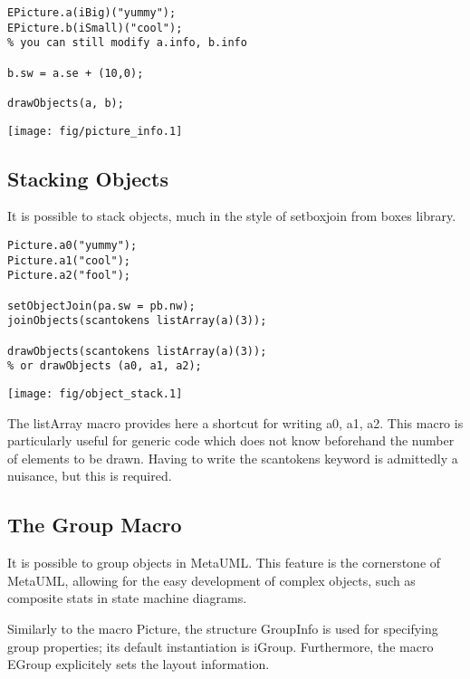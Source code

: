\documentclass{article}
\newcommand{\code}{\ttfamily}
\newcommand{\metauml}{MetaUML}
\begin{document}
\begin{multicols}{2}
\begin{verbatim}
EPicture.a(iBig)("yummy");
EPicture.b(iSmall)("cool");
% you can still modify a.info, b.info

b.sw = a.se + (10,0);

drawObjects(a, b);
\end{verbatim}
\columnbreak
\hspace{1cm}\texttt{[image: fig/picture\_info.1]}
\end{multicols}

\subsection{Stacking Objects}

It is possible to stack objects, much in the style of {\code setboxjoin}
from {\code boxes} library.

\pagebreak

\begin{multicols}{2}
\begin{verbatim}
Picture.a0("yummy");
Picture.a1("cool");
Picture.a2("fool");

setObjectJoin(pa.sw = pb.nw);
joinObjects(scantokens listArray(a)(3));

drawObjects(scantokens listArray(a)(3));
% or drawObjects (a0, a1, a2);
\end{verbatim}
\columnbreak
\hspace{1cm}\texttt{[image: fig/object\_stack.1]}
\end{multicols}

The {\code listArray} macro provides here a shortcut for writing
{\code a0, a1, a2}. This macro is particularly useful for generic
code which does not know beforehand the number of elements to be drawn.
Having to write the {\code scantokens} keyword is admittedly a nuisance, but
this is required.

\subsection{The Group Macro}

It is possible to group objects in \metauml. This feature is the cornerstone
of \metauml, allowing for the easy development of complex objects, such as
composite stats in state machine diagrams.

Similarly to the macro {\code Picture}, the structure {\code GroupInfo}
is used for specifying group properties; its default instantiation is
{\code iGroup}. Furthermore, the macro {\code EGroup} explicitely sets the
layout information.
\end{document}
